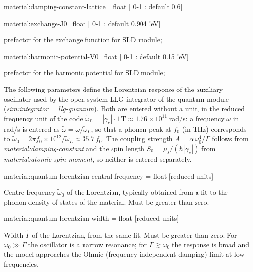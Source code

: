 {\zicf material:damping-constant-lattice= float [ 0-1 : default 0.6]}

{\zicf material:exchange-J0=float [ 0-1 : default 0.904 !eV]}  prefactor for the exchange function for SLD module;

{\zicf material:harmonic-potential-V0=float [ 0-1 : default 0.15 !eV]}  prefactor for the harmonic potential for SLD module;

The following parameters define the Lorentzian response of the auxiliary oscillator used by the open-system LLG integrator of the quantum module (\textit{sim:integrator = llg-quantum}). Both are entered without a unit, in the reduced frequency unit of the code $\tilde{\omega}_L = |\gamma_e| \cdot 1\,\mathrm{T} \approx 1.76 \times 10^{11}$ rad/s: a frequency $\omega$ in rad/s is entered as $\tilde{\omega} = \omega/\tilde{\omega}_L$, so that a phonon peak at $f_0$ (in THz) corresponds to $\tilde{\omega}_0 = 2\pi f_0 \times 10^{12}/\tilde{\omega}_L \approx 35.7\, f_0$. The coupling strength $A = \alpha\,\omega_0^4/\Gamma$ follows from \textit{material:damping-constant} and the spin length $S_0 = \mu_s/(\hbar |\gamma_e|)$ from \textit{material:atomic-spin-moment}, so neither is entered separately.

{\zicf material:quantum-lorentzian-central-frequency = float [reduced units]}
Centre frequency $\tilde{\omega}_0$ of the Lorentzian, typically obtained from a fit to the phonon density of states of the material. Must be greater than zero.

{\zicf material:quantum-lorentzian-width = float [reduced units]}
Width $\tilde{\Gamma}$ of the Lorentzian, from the same fit. Must be greater than zero. For $\omega_0 \gg \Gamma$ the oscillator is a narrow resonance; for $\Gamma \gtrsim \omega_0$ the response is broad and the model approaches the Ohmic (frequency-independent damping) limit at low frequencies.

